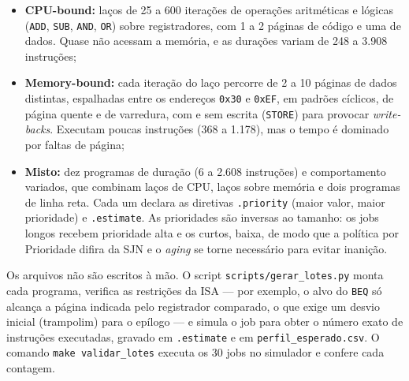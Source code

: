 \documentclass[conference]{IEEEtran}
\begin{document}
\begin{itemize}
    \item \textbf{CPU-bound:} laços de 25 a 600 iterações de operações aritméticas e lógicas (\texttt{ADD}, \texttt{SUB}, \texttt{AND}, \texttt{OR}) sobre registradores, com 1 a 2 páginas de código e uma de dados. Quase não acessam a memória, e as durações variam de 248 a 3.908 instruções;
    \item \textbf{Memory-bound:} cada iteração do laço percorre de 2 a 10 páginas de dados distintas, espalhadas entre os endereços \texttt{0x30} e \texttt{0xEF}, em padrões cíclicos, de página quente e de varredura, com e sem escrita (\texttt{STORE}) para provocar \textit{write-backs}. Executam poucas instruções (368 a 1.178), mas o tempo é dominado por faltas de página;
    \item \textbf{Misto:} dez programas de duração (6 a 2.608 instruções) e comportamento variados, que combinam laços de CPU, laços sobre memória e dois programas de linha reta. Cada um declara as diretivas \texttt{.priority} (maior valor, maior prioridade) e \texttt{.estimate}. As prioridades são inversas ao tamanho: os jobs longos recebem prioridade alta e os curtos, baixa, de modo que a política por Prioridade difira da SJN e o \textit{aging} se torne necessário para evitar inanição.
\end{itemize}

Os arquivos não são escritos à mão. O script \texttt{scripts/gerar\_lotes.py} monta cada programa, verifica as restrições da ISA --- por exemplo, o alvo do \texttt{BEQ} só alcança a página indicada pelo registrador comparado, o que exige um desvio inicial (trampolim) para o epílogo --- e simula o job para obter o número exato de instruções executadas, gravado em \texttt{.estimate} e em \texttt{perfil\_esperado.csv}. O comando \texttt{make validar\_lotes} executa os 30 jobs no simulador e confere cada contagem.
\end{document}
